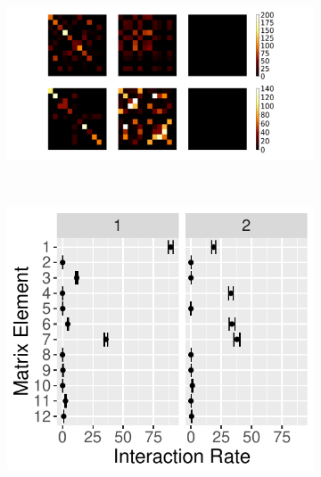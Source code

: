 \documentclass{article}
\begin{document}
\begin{figure}
    \centering
    \begin{subfigure}[b]{0.37\textwidth}
        \includegraphics[width=\textwidth]{heatmap.pdf}
        \caption{}
        \label{fig:heatmap}
    \end{subfigure}
    ~ %
    \begin{subfigure}[b]{0.21\textwidth}
        \includegraphics[width=\textwidth]{SchoolRateMatrix.pdf}
        \caption{}
        \label{fig:SchoolRateMatrix}
    \end{subfigure}
    ~ %
    \begin{subfigure}[b]{0.21\textwidth}

\end{subfigure}
\end{figure}
\end{document}
